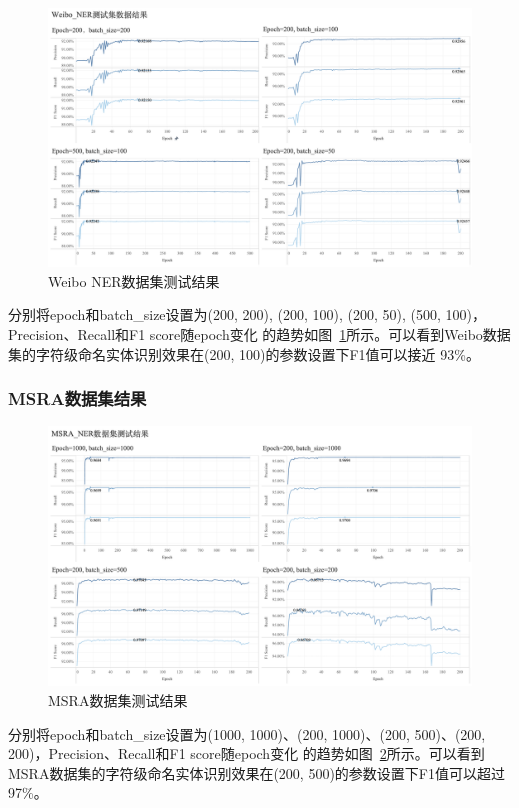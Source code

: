 \begin{figure}[!htp]
    \centering
    \label{fig:weibo_result}
    \includegraphics[width=14cm]{figures/weibo_ner_result.png}
    \caption{Weibo NER数据集测试结果}
\end{figure}

分别将epoch和batch\_size设置为(200, 200), (200, 100), (200, 50), (500, 100)，Precision、Recall和F1 score随epoch变化
的趋势如图~\ref{fig:weibo_result}所示。可以看到Weibo数据集的字符级命名实体识别效果在(200, 100)的参数设置下F1值可以接近
93\%。


\subsubsection{MSRA数据集结果}

\begin{figure}[!htp]
    \centering
    \label{fig:MSRA_result}
    \includegraphics[width=14cm]{figures/MSRA_ner_result.png}
    \caption{MSRA数据集测试结果}
\end{figure}

分别将epoch和batch\_size设置为(1000, 1000)、(200, 1000)、(200, 500)、(200, 200)，Precision、Recall和F1 score随epoch变化
的趋势如图~\ref{fig:MSRA_result}所示。可以看到MSRA数据集的字符级命名实体识别效果在(200, 500)的参数设置下F1值可以超过97\%。
